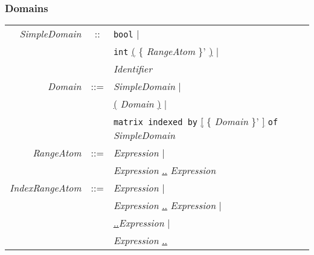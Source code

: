 \documentclass{article}
\begin{document}
\subsubsection{Domains}
\begin{tabular}{rcl}

\textit{SimpleDomain} & :: & \texttt{bool} $\mid$ \\
                      &    & \texttt{int} \underline{(} \{ \textit{RangeAtom} \}' \underline{)} $\mid$ \\
                      &    & \textit{Identifier} \\
\textit{Domain} & ::= &  \textit{SimpleDomain} $\mid$ \\
                &     & \underline{(} \textit{Domain} \underline{)} $\mid$ \\
                &     & \texttt{matrix indexed by} \underline{[} \{
  \textit{Domain} \}'  \underline{]} \texttt{of} \textit{SimpleDomain} \\ 
\textit{RangeAtom} & ::= & \textit{Expression} $\mid$ \\
                   &     & \textit{Expression} \underline{..} \textit{Expression} \\ 
\textit{IndexRangeAtom} & ::= & \textit{Expression} $\mid$ \\
                   &     & \textit{Expression} \underline{..} \textit{Expression} $\mid$\\ 
                   &     &  \underline{..}\textit{Expression} $\mid$\\ 
                   &     & \textit{Expression} \underline{..} \\ 

\end{tabular}
\end{document}
